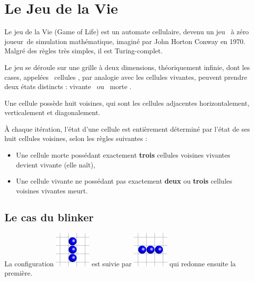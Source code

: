\section{Le Jeu de la Vie}

Le jeu de la Vie (Game of Life) est un automate cellulaire, devenu un jeu \og\ à zéro joueur\fg\ de simulation mathématique, imaginé par John Horton Conway en 1970. Malgré des règles très simples, il est Turing-complet. 

Le jeu se déroule sur une grille à deux dimensions, théoriquement infinie, dont les cases, appelées \og\ cellules \fg, par analogie avec les cellules vivantes, peuvent prendre deux états distincts : \og vivante \fg\ ou \og\ morte \fg.

Une cellule possède huit voisines, qui sont les cellules adjacentes horizontalement, verticalement et diagonalement.

\newpage

À chaque itération, l'état d’une cellule est entièrement déterminé par l’état de ses huit cellules voisines, selon les règles suivantes :
\begin{itemize}
 \item Une cellule morte possédant exactement \textbf{trois} cellules voisines vivantes devient vivante (elle naît),
 \item Une cellule vivante ne possédant pas exactement \textbf{deux} ou \textbf{trois} cellules voisines vivantes meurt.
\end{itemize}

\subsection{Le cas du blinker}

La configuration \includegraphics[width=.07\linewidth]{img/Gol-blinker2.png} est suivie par \includegraphics[width=.07\linewidth]{img/Gol-blinker1.png} qui redonne ensuite la première.

